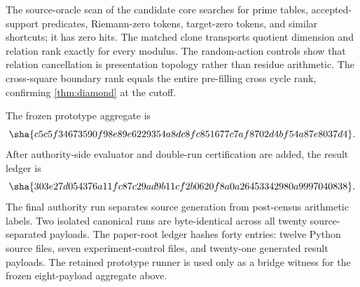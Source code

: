 The source-oracle scan of the candidate core searches for prime tables,
accepted-support predicates, Riemann-zero tokens, target-zero tokens, and
similar shortcuts; it has zero hits.  The matched clone transports quotient
dimension and relation rank exactly for every modulus.  The random-action
controls show that relation cancellation is presentation topology rather than
residue arithmetic.  The cross-square boundary rank equals the entire
pre-filling cross cycle rank, confirming \cref{thm:diamond} at the cutoff.

The frozen prototype aggregate is
\[
\sha{c5c5f34673590f98e89e6229354a8dc8fc851677c7af8702d4bf54a87e8037d4}.
\]
After authority-side evaluator and double-run certification are added, the
result ledger is
\[
\sha{303e27d054376a11fc87c29ad9b11cf2b0620f8a0a26453342980a9997040838}.
\]
The final authority run separates source generation from post-census
arithmetic labels.  Two isolated canonical runs are byte-identical across all
twenty source-separated payloads.  The paper-root ledger hashes forty entries:
twelve Python source files, seven experiment-control files, and twenty-one
generated result payloads.  The retained prototype runner is used only as a
bridge witness for the frozen eight-payload aggregate above.
